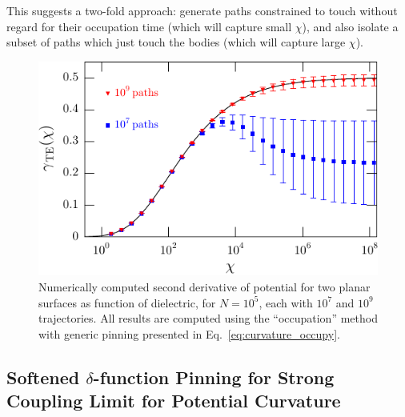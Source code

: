 This suggests a two-fold approach: generate paths constrained to touch without regard for their
occupation time (which will capture small $\chi$), and also isolate a subset of paths which just touch the 
bodies (which will capture large $\chi$).  


\begin{figure}
  \centering
  \includegraphics[width=0.6\columnwidth]{fig/numerics/curvature_a}
  \caption[Numerical TE Potential Curvature for two planar surfaces, evaluated with occupation method]{
    Numerically computed second derivative of potential for two planar surfaces as function 
    of dielectric, for $N=10^5$, each with $10^7$ and $10^9$ trajectories.  
    All results are computed using the ``occupation'' method with generic pinning presented in Eq.~\ref{eq:curvature_occupy}.}
\label{fig:curvature_a}
\end{figure}

\subsection{Softened $\delta$-function Pinning for Strong Coupling Limit for Potential Curvature}

